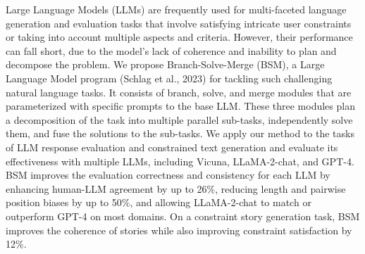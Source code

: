 Large Language Models (LLMs) are frequently used for multi-faceted language generation and evaluation tasks that involve satisfying intricate user constraints or taking into account multiple aspects and criteria. However, their performance can fall short, due to the model's lack of coherence and inability to plan and decompose the problem. We propose Branch-Solve-Merge (BSM), a Large Language Model program (Schlag et al., 2023) for tackling such challenging natural language tasks. It consists of branch, solve, and merge modules that are parameterized with specific prompts to the base LLM. These three modules plan a decomposition of the task into multiple parallel sub-tasks, independently solve them, and fuse the solutions to the sub-tasks. We apply our method to the tasks of LLM response evaluation and constrained text generation and evaluate its effectiveness with multiple LLMs, including Vicuna, LLaMA-2-chat, and GPT-4. BSM improves the evaluation correctness and consistency for each LLM by enhancing human-LLM agreement by up to 26\%, reducing length and pairwise position biases by up to 50\%, and allowing LLaMA-2-chat to match or outperform GPT-4 on most domains. On a constraint story generation task, BSM improves the coherence of stories while also improving constraint satisfaction by 12\%.